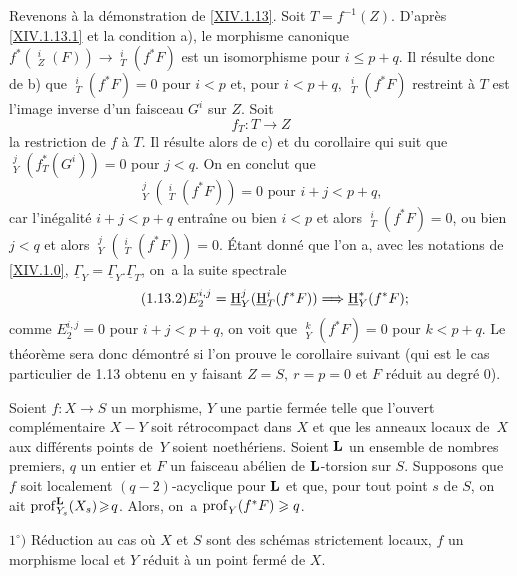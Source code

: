 Revenons \`a la d\'emonstration de \ref{XIV.1.13}. Soit $T=f^{-1}(Z)$. D'apr\`es \ref{XIV.1.13.1} et la condition a), le morphisme canonique $f^*(\mathop{\underline{\mathrm{H}}}\nolimits_Z^i(F))\to\mathop{\underline{\mathrm{H}}}\nolimits_T^i(f^*F)$ est un isomorphisme pour $i\leq p+q$. Il r\'esulte donc de b) que $\mathop{\underline{\mathrm{H}}}\nolimits^i_T(f^*F)=0$ pour $i<p$ et, pour $i<p+q, \ \mathop{\underline{\mathrm{H}}}\nolimits^i_T(f^*F)$ restreint \`a $T$ est l'image inverse d'un faisceau $G^i$ sur $Z$. Soit
$$f_T:T\to Z$$
la restriction de $f$ \`a $T$. Il r\'esulte alors de c) et du corollaire qui suit que $\mathop{\underline{\mathrm{H}}}\nolimits^j_Y(f^*_T(G^i))=0$ pour $j<q$. On en conclut que
$$
\mathop{\underline{\mathrm{H}}}\nolimits^j_Y(\mathop{\underline{\mathrm{H}}}\nolimits^i_T(f^*F))=0\text{ pour } i+j<p+q,
$$
car l'in\'egalit\'e $i+j<p+q$ entra\^ine ou bien $i<p$ et alors $\mathop{\underline{\mathrm{H}}}\nolimits^i_T(f^*F)=0$, ou bien $j<q$ et alors $\mathop{\underline{\mathrm{H}}}\nolimits_Y^j(\mathop{\underline{\mathrm{H}}}\nolimits_T^i(f^*F))=0$. \'Etant donn\'e que l'on a, avec les notations de \ref{XIV.1.0}, $\underline{\Gamma}_Y=\underline{\Gamma}_Y.\underline{\Gamma}_T$, on~a la suite spectrale
\begin{equation*} \label{eq:XIV.1.13.2} \tag{1.13.2}
E_2^{i, j}=\mathop{\underline{\mathrm{H}}}\nolimits_Y^j(\mathop{\underline{\mathrm{H}}}\nolimits_T^i(f^*F))\To\mathop{\underline{\mathrm{H}}}\nolimits^*_Y(f^*F);
\end{equation*}
comme $E_2^{i, j}=0$ pour $i+j<p+q$, on voit que $\mathop{\underline{\mathrm{H}}}\nolimits_Y^k(f^*F)=0$ pour $k<p+q$. Le th\'eor\`eme sera donc d\'emontr\'e si l'on prouve le corollaire suivant (qui est le cas particulier de 1.13 obtenu en y faisant $Z=S, \ r=p=0$ et $F$ r\'eduit au degr\'e $0$).

\begin{corollaire}\label{XIV.1.14}
Soient $f:X\to S$ un morphisme, $Y$ une partie ferm\'ee telle que l'ouvert compl\'ementaire $X- Y$ soit r\'etrocompact dans $X$ et que les anneaux locaux de~$X$ aux diff\'erents points de~$Y$ soient noeth\'eriens. Soient $\mathbf{L}$ un ensemble de nombres \hbox{premiers}, $q$ un entier et $F$ un faisceau ab\'elien de $\mathbf{L}$-torsion sur $S$. Supposons que~$f$ soit localement $(q-2)$-acyclique pour $\mathbf{L}$ et que, pour tout point $s$ de $S$, on ait \hbox{$\operatorname{prof}_{Y_s}^{\mathbf{L}}(X_s)\!\geqslant\! q$}. Alors, on~a $\operatorname{prof}_Y(f^*F)\geqslant q$.
\end{corollaire}

$1^\circ)$ R\'eduction au cas o\`u $X$ et $S$ sont des sch\'emas strictement locaux, $f$ un morphisme local et $Y$ r\'eduit \`a un point ferm\'e de $X$.

